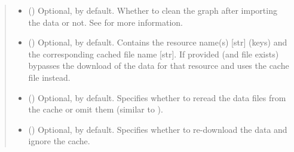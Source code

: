 \documentclass[letterpaper,10pt,english]{sphinxmanual}
\begin{document}
\begin{fulllineitems}
\begin{fulllineitems}
\begin{quote}
\begin{description}
\begin{itemize}
\item {} 
 () \textendash{} Optional,  by default. Whether to clean the graph
after importing the data or not. See
{\hyperref[\detokenize{reference:pypath.main.PyPath.clean_graph}]{}} for more
information.

\item {} 
 () \textendash{} Optional, \sphinxcode{\sphinxupquote{\{\}}} by default. Contains the resource name(s)
{[}str{]} (keys) and the corresponding cached file name {[}str{]}.
If provided (and file exists) bypasses the download of the
data for that resource and uses the cache file instead.

\item {} 
 () \textendash{} Optional,  by default. Specifies whether to reread
the data files from the cache or omit them (similar to
).

\item {} 
 () \textendash{} Optional,  by default. Specifies whether to
re-download the data and ignore the cache.

\end{itemize}

\end{description}\end{quote}

\end{fulllineitems}



\end{fulllineitems}
\end{document}
